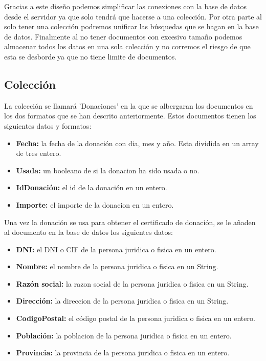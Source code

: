 Gracias a este diseño podemos simplificar las conexiones con la base de datos desde el servidor ya que solo tendrá que hacerse a una colección. Por otra parte al solo tener una colección podremos unificar las búsquedas que se hagan en la base de datos. Finalmente al no tener documentos con excesivo tamaño podemos almacenar todos los datos en una sola colección y no corremos el riesgo de que esta se desborde ya que no tiene limite de documentos.

\subsection{Colección}

La colección se llamará 'Donaciones' en la que se albergaran los documentos en los dos formatos que se han descrito anteriormente. Estos documentos tienen los siguientes datos y formatos:

\begin{itemize}
	\item \textbf{Fecha:} la fecha de la donación con dia, mes y año. Esta dividida en un array de tres entero.
	\item \textbf{Usada:} un booleano de si la donacion ha sido usada o no. 
	\item \textbf{IdDonación:} el id de la donación en un entero.
	\item \textbf{Importe:} el importe de la donacion en un entero.
\end{itemize}

Una vez la donación se usa para obtener el certificado de donación, se le añaden al documento en la base de datos los siguientes datos:

\begin{itemize}
	\item \textbf{DNI:} el DNI o CIF de la persona juridica o fisica en un entero.
	\item \textbf{Nombre:} el nombre de la persona juridica o fisica en un String.
	\item \textbf{Razón social:} la razon social de la persona juridica o fisica en un String.
	\item \textbf{Dirección:} la direccion de la persona juridica o fisica en un String.
	\item \textbf{CodigoPostal:} el código postal de la persona juridica o fisica en un entero.
	\item \textbf{Población:} la poblacion de la persona juridica o fisica en un entero.
	\item \textbf{Provincia:} la provincia de la persona juridica o fisica en un entero.
\end{itemize}


